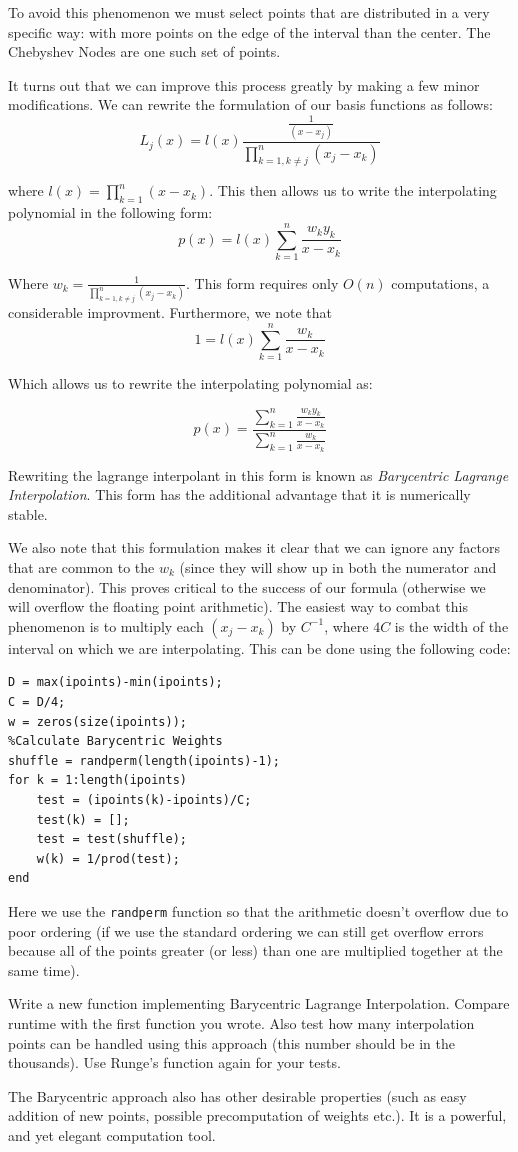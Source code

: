 To avoid this phenomenon we must select points that are distributed in a very specific way: with more points on the edge of the interval than the center. The Chebyshev Nodes are one such set of points.

It turns out that we can improve this process greatly by making a few minor modifications. We can rewrite the formulation of our basis functions as follows:
\[
L_j(x) = l(x)\frac{\frac{1}{(x-x_j)}}{\displaystyle\prod_{k=1, k \neq j}^n (x_j-x_k)}
\]

where $l(x) = \prod_{k=1}^n (x-x_k)$. This then allows us to write the interpolating polynomial in the following form:
\[
p(x) = l(x) \sum_{k=1}^n \frac{w_k y_k}{x-x_k}
\]

Where $w_k = \frac{1}{\prod_{k=1, k \neq j}^n (x_j-x_k)}$. This form requires only $O(n)$ computations, a considerable improvment. Furthermore, we note that
\[
1 = l(x) \sum_{k=1}^n \frac{w_k}{x-x_k}
\]

Which allows us to rewrite the interpolating polynomial as:

\[
p(x) = \frac{\displaystyle\sum_{k=1}^n \frac{w_k y_k}{x-x_k}}{\displaystyle\sum_{k=1}^n \frac{w_k}{x-x_k}}
\]

Rewriting the lagrange interpolant in this form is known as \emph{Barycentric Lagrange Interpolation}. This form has the additional advantage that it is numerically stable.

We also note that this formulation makes it clear that we can ignore any factors that are common to the $w_k$ (since they will show up in both the numerator and denominator). This proves critical to the success of our formula (otherwise we will overflow the floating point arithmetic). The easiest way to combat this phenomenon is to multiply each $(x_j-x_k)$ by $C^{-1}$, where $4C$ is the width of the interval on which we are interpolating. This can be done using the following code:

\begin{verbatim}
D = max(ipoints)-min(ipoints);
C = D/4;
w = zeros(size(ipoints));
%Calculate Barycentric Weights
shuffle = randperm(length(ipoints)-1);
for k = 1:length(ipoints)
    test = (ipoints(k)-ipoints)/C;
    test(k) = [];
    test = test(shuffle);
    w(k) = 1/prod(test);
end
\end{verbatim}

Here we use the {\tt randperm} function so that the arithmetic doesn't overflow due to poor ordering (if we use the standard ordering we can still get overflow errors because all of the points greater (or less) than one are multiplied together at the same time).

\begin{problem}
Write a new function implementing Barycentric Lagrange Interpolation. Compare runtime with the first function you wrote. Also test how many interpolation points can be handled using this approach (this number should be in the thousands). Use Runge's function again for your tests.
\end{problem}

The Barycentric approach also has other desirable properties (such as easy addition of new points, possible precomputation of weights etc.). It is a powerful, and yet elegant computation tool.